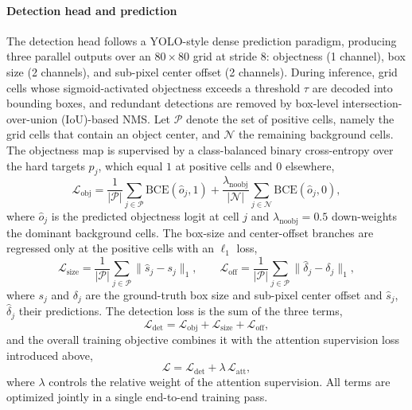 \documentclass[lettersize,journal]{IEEEtran}
\begin{document}
\paragraph{Detection head and prediction}
The detection head follows a YOLO-style dense prediction paradigm, 
producing three parallel outputs over an $80\times80$ grid at stride 8: 
objectness (1 channel), box size (2 channels), and sub-pixel center offset (2 channels). 
During inference, grid cells whose sigmoid-activated objectness exceeds a threshold $\tau$ are decoded into bounding boxes, 
and redundant detections are removed by box-level intersection-over-union (IoU)-based NMS.
Let $\mathcal{P}$ denote the set of positive cells, namely the grid cells that contain an object center, and $\mathcal{N}$ the remaining background cells.
The objectness map is supervised by a class-balanced binary cross-entropy over the hard targets $p_j$, which equal $1$ at positive cells and $0$ elsewhere,
\begin{equation}
\mathcal{L}_{\mathrm{obj}} = \frac{1}{|\mathcal{P}|}\sum_{j\in\mathcal{P}} \mathrm{BCE}(\hat{o}_j, 1)
+ \frac{\lambda_{\mathrm{noobj}}}{|\mathcal{N}|}\sum_{j\in\mathcal{N}} \mathrm{BCE}(\hat{o}_j, 0),
\end{equation}
where $\hat{o}_j$ is the predicted objectness logit at cell $j$ and $\lambda_{\mathrm{noobj}}=0.5$ down-weights the dominant background cells.
The box-size and center-offset branches are regressed only at the positive cells with an $\ell_1$ loss,
\begin{equation}
\mathcal{L}_{\mathrm{size}} = \frac{1}{|\mathcal{P}|}\sum_{j\in\mathcal{P}} \lVert \hat{s}_j - s_j \rVert_1,
\qquad
\mathcal{L}_{\mathrm{off}} = \frac{1}{|\mathcal{P}|}\sum_{j\in\mathcal{P}} \lVert \hat{\delta}_j - \delta_j \rVert_1,
\end{equation}
where $s_j$ and $\delta_j$ are the ground-truth box size and sub-pixel center offset and $\hat{s}_j$, $\hat{\delta}_j$ their predictions.
The detection loss is the sum of the three terms,
\begin{equation}
\mathcal{L}_{\mathrm{det}} = \mathcal{L}_{\mathrm{obj}} + \mathcal{L}_{\mathrm{size}} + \mathcal{L}_{\mathrm{off}},
\end{equation}
and the overall training objective combines it with the attention supervision loss introduced above,
\begin{equation}
\mathcal{L} = \mathcal{L}_{\mathrm{det}} + \lambda\, \mathcal{L}_{\mathrm{att}},
\end{equation}
where $\lambda$ controls the relative weight of the attention supervision. All terms are optimized jointly in a single end-to-end training pass.
\end{document}
